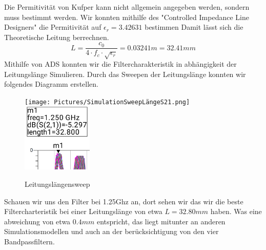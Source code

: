     Die Permitivität von Kufper kann nicht allgemein angegeben werden, sondern muss bestimmt werden. 
    Wir konnten mithilfe des "Controlled Impedance Line Designers" die Permitivität auf $\epsilon_r = 3.42631$ bestimmen 
    Damit lässt sich die Theoretische Leitung berrechnen.
    \begin{equation}
        L= \frac{c_0}{4 \cdot f_c \cdot \sqrt{\epsilon_r}} = 0.03241m = 32.41mm
        \label{eq:laenge}
    \end{equation}
    \clearpage
    Mithilfe von ADS konnten wir die Filtercharakteristik in abhängigkeit der Leitungslänge Simulieren. Durch das Sweepen der 
    Leitungslänge konnten wir folgendes Diagramm erstellen.
    \begin{figure}[H]
        \texttt{[image: Pictures/SimulationSweepLängeS21.png]}
        \includegraphics[width=0.3\textwidth]{Pictures/gezoomt.png}
        \centering
        \caption{Leitungslängensweep}
    \end{figure}
    Schauen wir uns den Filter bei 1.25Ghz an, dort sehen wir das wir die beste Filtercharteristik bei einer
    Leitungslänge von etwa $L=32.80mm$ haben.
    Was eine abweichung von etwa $0.4mm$ entspricht, das liegt mitunter an anderen 
    Simulationsmodellen und auch an der berücksichtigung von den vier Bandpassfiltern.

    \clearpage
